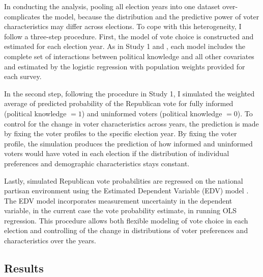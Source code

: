 \documentclass[letterpaper, 12pt]{article}
\begin{document}
    \par In conducting the analysis, pooling all election years into one dataset over-complicates the model, because the distribution and the predictive power of voter characteristics may differ across elections. To cope with this heterogeneity, I follow a three-step procedure. First, the model of vote choice is constructed and estimated for each election year. As in Study 1 and \cite{Bartels1996unvo}, each model includes the complete set of interactions between political knowledge and all other covariates and estimated by the logistic regression with population weights provided for each survey.
    
    \par In the second step, following the procedure in Study 1, I simulated the weighted average of predicted probability of the Republican vote for fully informed (political knowledge $=1$) and uninformed voters (political knowledge $=0$). To control for the change in voter characteristics across years, the prediction is made by fixing the voter profiles to the specific election year. By fixing the voter profile, the simulation produces the prediction of how informed and uninformed voters would have voted in each election if the distribution of individual preferences and demographic characteristics stays constant. 
    
    \par Lastly, simulated Republican vote probabilities are regressed on the national partisan environment using the Estimated Dependent Variable (EDV) model \citep{Lewis2005esre, Kasara2015whdo}. The EDV model incorporates measurement uncertainty in the dependent variable, in the current case the vote probability estimate, in running OLS regression. This procedure allows both flexible modeling of vote choice in each election and controlling of the change in distributions of voter preferences and characteristics over the years.
    
    \subsection*{Results}
\end{document}
